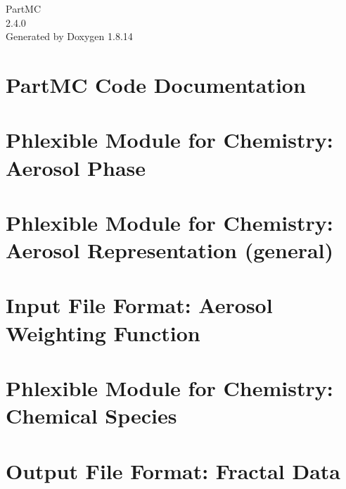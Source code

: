\documentclass[twoside]{book}
\newcommand{\+}{\discretionary{\mbox{\scriptsize$\hookleftarrow$}}{}{}}
\newcommand{\clearemptydoublepage}{%
  \newpage{\pagestyle{empty}\cleardoublepage}%
}
\begin{document}
\hypersetup{pageanchor=false,
             bookmarksnumbered=true,
             pdfencoding=unicode
            }
\begin{titlepage}
\vspace*{7cm}
\begin{center}%
{\Large Part\+MC \\[1ex]\large 2.\+4.\+0 }\\
\vspace*{1cm}
{\large Generated by Doxygen 1.8.14}\\
\end{center}
\end{titlepage}
\clearemptydoublepage
{}
\tableofcontents
\clearemptydoublepage
{}
\hypersetup{pageanchor=true}

\chapter{Part\+MC Code Documentation}
\label{index}\hypertarget{index}{}
\chapter{Phlexible Module for Chemistry\+: Aerosol Phase}
\label{phlex_aero_phase}

\chapter{Phlexible Module for Chemistry\+: Aerosol Representation (general)}
\label{phlex_aero_rep}

\chapter{Input File Format\+: Aerosol Weighting Function}
\label{input_format_aero_weight}

\chapter{Phlexible Module for Chemistry\+: Chemical Species}
\label{phlex_species}

\chapter{Output File Format\+: Fractal Data}
\label{output_format_fractal}

\end{document}
